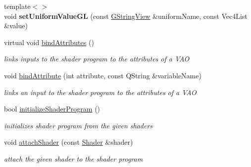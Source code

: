 \begin{Indent}
\begin{DoxyCompactItemize}
\item 
\mbox{\label{classrev_1_1_shader_program_ae6f8027a753d56658cacea49c066414d}} 
{\footnotesize template$<$$>$ }\\void {\bfseries set\+Uniform\+Value\+GL} (const \mbox{\hyperlink{classrev_1_1_g_string_view}{G\+String\+View}} \&uniform\+Name, const Vec4\+List \&value)
\item 
\mbox{\label{classrev_1_1_shader_program_a5f483b57db3e2a77290ecb4892c47ead}} 
virtual void \mbox{\hyperlink{classrev_1_1_shader_program_a5f483b57db3e2a77290ecb4892c47ead}{bind\+Attributes}} ()
\begin{DoxyCompactList}\small\item\em links inputs to the shader program to the attributes of a V\+AO \end{DoxyCompactList}\item 
\mbox{\label{classrev_1_1_shader_program_a3956d9621c0075306c3a139a2dca27ff}} 
void \mbox{\hyperlink{classrev_1_1_shader_program_a3956d9621c0075306c3a139a2dca27ff}{bind\+Attribute}} (int attribute, const Q\+String \&variable\+Name)
\begin{DoxyCompactList}\small\item\em links an input to the shader program to the attributes of a V\+AO \end{DoxyCompactList}\item 
\mbox{\label{classrev_1_1_shader_program_a398000adb24c89c164d8c3a66968f2f7}} 
bool \mbox{\hyperlink{classrev_1_1_shader_program_a398000adb24c89c164d8c3a66968f2f7}{initialize\+Shader\+Program}} ()
\begin{DoxyCompactList}\small\item\em initializes shader program from the given shaders \end{DoxyCompactList}\item 
\mbox{\label{classrev_1_1_shader_program_aa4653fe37071ac78790325b458108202}} 
void \mbox{\hyperlink{classrev_1_1_shader_program_aa4653fe37071ac78790325b458108202}{attach\+Shader}} (const \mbox{\hyperlink{classrev_1_1_shader}{Shader}} \&shader)
\begin{DoxyCompactList}\small\item\em attach the given shader to the shader program \end{DoxyCompactList}\item 

\end{DoxyCompactItemize}
\end{Indent}
